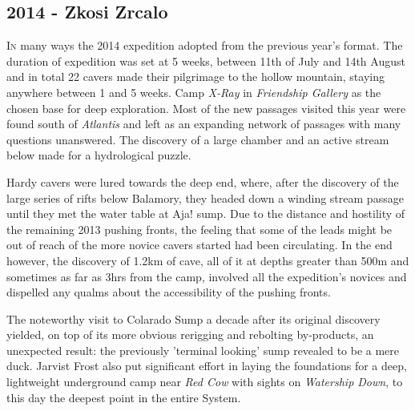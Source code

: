 \newpage
\begin{tcolorbox}
	


\chapter{2014 - Zkosi Zrcalo}
		\lettrine{I}{n} many ways the 2014 expedition adopted from the previous year's format. The duration of expedition was set at 5 weeks, between 11th of July and 14th August and in total 22 cavers made their pilgrimage to the hollow mountain, staying anywhere between 1 and 5 weeks. Camp \emph{X-Ray} in \emph{Friendship Gallery} as the chosen base for deep exploration. Most of the new passages visited this year were found south of \emph{Atlantis} and left as an expanding network of passages with many questions unanswered. The discovery of a large chamber and an active stream below made for a hydrological puzzle. 

		Hardy cavers were lured towards the deep end, where, after the discovery of the large series of rifts below Balamory, they headed down a winding stream passage until they met the water table at Aja! sump.  Due to the distance and hostility of the remaining 2013 pushing fronts, the feeling that some of the leads might be out of reach of the more novice cavers started had been circulating. In the end however, the discovery of 1.2km of cave, all of it at depths greater than 500m and sometimes as far as 3hrs from the camp, involved all the expedition's novices and dispelled any qualms about the accessibility of the pushing fronts.

 		The noteworthy visit to Colarado Sump a decade after its original discovery yielded, on top of its more obvious rerigging and rebolting by-products, an unexpected result: the previously 'terminal looking' sump revealed to be a mere duck. Jarvist Frost also put significant effort in laying the foundations for a deep, lightweight underground camp near \emph{Red Cow} with sights on \emph{Watership Down}, to this day the deepest point in the entire System.
		\\
		\\
		\\
		
\end{tcolorbox}

